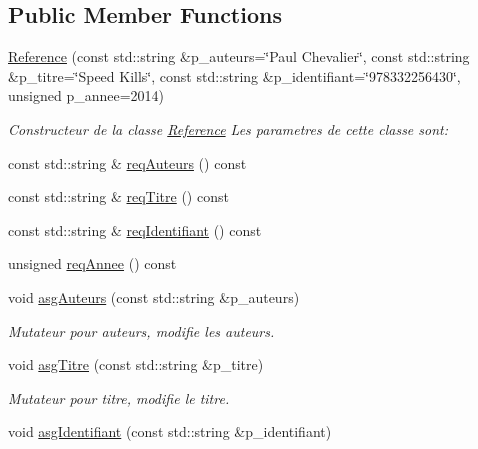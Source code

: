 \subsection*{Public Member Functions}
\begin{DoxyCompactItemize}
\item 
\hyperlink{classtp_1_1Reference_acea8bdd14988b8b699bc0fb78bca6302}{Reference} (const std\+::string \&p\+\_\+auteurs=\char`\"{}Paul Chevalier\char`\"{}, const std\+::string \&p\+\_\+titre=\char`\"{}Speed Kills\char`\"{}, const std\+::string \&p\+\_\+identifiant=\char`\"{}978332256430\char`\"{}, unsigned p\+\_\+annee=2014)
\begin{DoxyCompactList}\small\item\em Constructeur de la classe \hyperlink{classtp_1_1Reference}{Reference} Les parametres de cette classe sont\+: \end{DoxyCompactList}\item 
const std\+::string \& \hyperlink{classtp_1_1Reference_abfdff53e68702977fb384a50b01c0f00}{req\+Auteurs} () const 
\item 
const std\+::string \& \hyperlink{classtp_1_1Reference_ae08e4a53bf172bb0bd208150a5c5699d}{req\+Titre} () const 
\item 
const std\+::string \& \hyperlink{classtp_1_1Reference_adfad13c3fb4a9e0eae59e0945c66666e}{req\+Identifiant} () const 
\item 
unsigned \hyperlink{classtp_1_1Reference_ace181178a68541f6794f8fb4f69d2aee}{req\+Annee} () const 
\item 
\hypertarget{classtp_1_1Reference_a5f2610f7f46ec237f69a73f2ba58ba78}{}void \hyperlink{classtp_1_1Reference_a5f2610f7f46ec237f69a73f2ba58ba78}{asg\+Auteurs} (const std\+::string \&p\+\_\+auteurs)\label{classtp_1_1Reference_a5f2610f7f46ec237f69a73f2ba58ba78}

\begin{DoxyCompactList}\small\item\em Mutateur pour auteurs, modifie les auteurs. \end{DoxyCompactList}\item 
\hypertarget{classtp_1_1Reference_a42ae9fbbfdbe64d1fb2b6b4eb2a6466a}{}void \hyperlink{classtp_1_1Reference_a42ae9fbbfdbe64d1fb2b6b4eb2a6466a}{asg\+Titre} (const std\+::string \&p\+\_\+titre)\label{classtp_1_1Reference_a42ae9fbbfdbe64d1fb2b6b4eb2a6466a}

\begin{DoxyCompactList}\small\item\em Mutateur pour titre, modifie le titre. \end{DoxyCompactList}\item 
\hypertarget{classtp_1_1Reference_aa1a84679155a34d39b3f115ffb779257}{}void \hyperlink{classtp_1_1Reference_aa1a84679155a34d39b3f115ffb779257}{asg\+Identifiant} (const std\+::string \&p\+\_\+identifiant)\label{classtp_1_1Reference_aa1a84679155a34d39b3f115ffb779257}


\end{DoxyCompactItemize}

